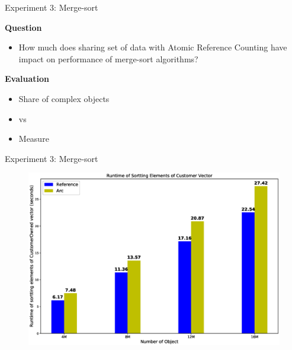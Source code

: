 \documentclass[9pt]{beamer}
\begin{document}

\begin{frame}[fragile]{Experiment 3: Merge-sort}

    \textbf{Question}
    \begin{itemize}
        \item How much does sharing set of data with Atomic Reference Counting have impact on performance of merge-sort algorithms?
    \end{itemize}

    \vspace{0.5cm}

    \textbf{Evaluation}
    \begin{itemize}
        \item Share  of complex objects
        \item {} vs 
        \item Measure 
    \end{itemize}
\end{frame}



\begin{frame}[fragile]{Experiment 3: Merge-sort}
    \vspace{-0.7cm}
    \begin{figure}[hp]
        \centering
        \begin{center}
                \includegraphics[width=1.1\textwidth]{images/rust_merge_sort.eps}
                \captionsetup{labelformat=empty}
        \end{center}
    \end{figure}
\end{frame}
\end{document}
